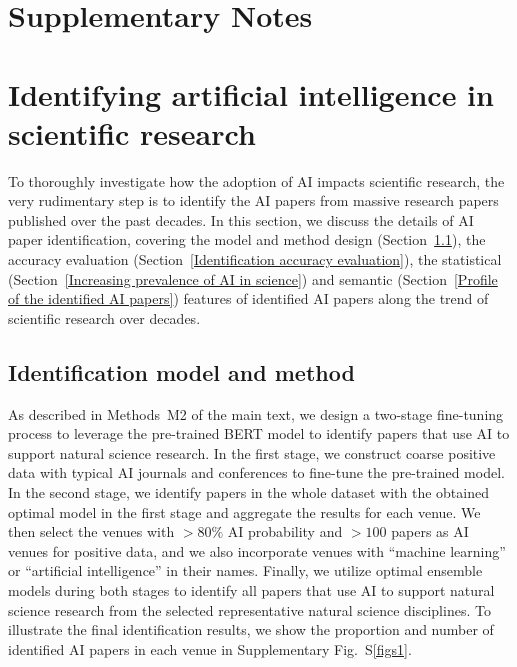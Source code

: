 \newpage
\section*{Supplementary Notes}
\section{Identifying artificial intelligence in scientific research}
To thoroughly investigate how the adoption of AI impacts scientific research, the very rudimentary step is to identify the AI papers from massive research papers published over the past decades.
In this section, we discuss the details of AI paper identification, covering the model and method design (Section~\ref{Identification of AI papers}), the accuracy evaluation (Section~\ref{Identification accuracy evaluation}), the statistical (Section~\ref{Increasing prevalence of AI in science}) and semantic (Section~\ref{Profile of the identified AI papers}) features of identified AI papers along the trend of scientific research over decades.

\subsection{Identification model and method}
\label{Identification of AI papers}
As described in Methods~M2 of the main text, we design a two-stage fine-tuning process to leverage the pre-trained BERT model to identify papers that use AI to support natural science research.
In the first stage, we construct coarse positive data with typical AI journals and conferences to fine-tune the pre-trained model.
In the second stage, we identify papers in the whole dataset with the obtained optimal model in the first stage and aggregate the results for each venue.
We then select the venues with $>80\%$ AI probability and $>100$ papers as AI venues for positive data, and we also incorporate venues with “machine learning” or “artificial intelligence” in their names.
Finally, we utilize optimal ensemble models during both stages to identify all papers that use AI to support natural science research from the selected representative natural science disciplines.
To illustrate the final identification results, we show the proportion and number of identified AI papers in each venue in Supplementary Fig.~S\ref{figs1}.


